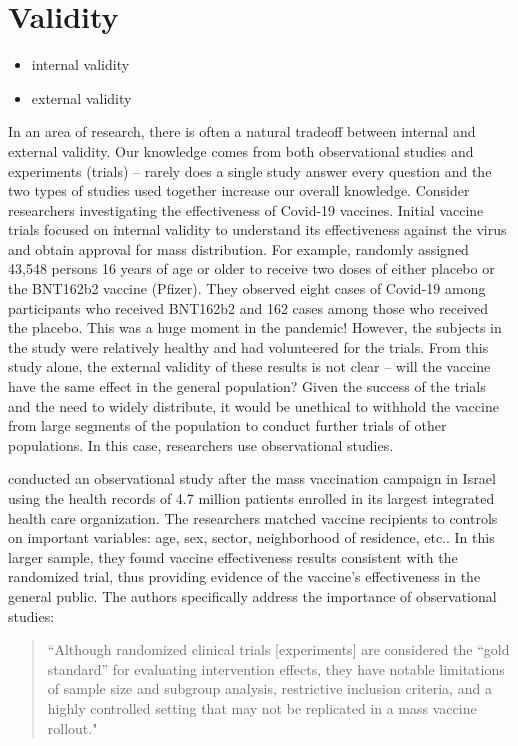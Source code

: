\documentclass[
]{book}
\begin{document}
\hypertarget{validity}{%
\section{Validity}\label{validity}}

\begin{itemize}
\item
  internal validity
\item
  external validity
\end{itemize}

In an area of research, there is often a natural tradeoff between internal and external validity. Our knowledge comes from both observational studies and experiments (trials) -- rarely does a single study answer every question and the two types of studies used together increase our overall knowledge. Consider researchers investigating the effectiveness of Covid-19 vaccines. Initial vaccine trials focused on internal validity to understand its effectiveness against the virus and obtain approval for mass distribution. For example, \citet{polack2020safety} randomly assigned 43,548 persons 16 years of age or older to receive two doses of either placebo or the BNT162b2 vaccine (Pfizer). They observed eight cases of Covid-19 among participants who received BNT162b2 and 162 cases among those who received the placebo. This was a huge moment in the pandemic! However, the subjects in the study were relatively healthy and had volunteered for the trials. From this study alone, the external validity of these results is not clear -- will the vaccine have the same effect in the general population? Given the success of the trials and the need to widely distribute, it would be unethical to withhold the vaccine from large segments of the population to conduct further trials of other populations. In this case, researchers use observational studies.

\citet{dagan2021bnt162b2} conducted an observational study after the mass vaccination campaign in Israel using the health records of 4.7 million patients enrolled in its largest integrated health care organization. The researchers matched vaccine recipients to controls on important variables: age, sex, sector, neighborhood of residence, etc.. In this larger sample, they found vaccine effectiveness results consistent with the randomized trial, thus providing evidence of the vaccine's effectiveness in the general public. The authors specifically address the importance of observational studies:

\begin{quote}
``Although randomized clinical trials {[}experiments{]} are considered the ``gold standard'' for evaluating intervention effects, they have notable limitations of sample size and subgroup analysis, restrictive inclusion criteria, and a highly controlled setting that may not be replicated in a mass vaccine rollout."
\end{quote}
\end{document}
